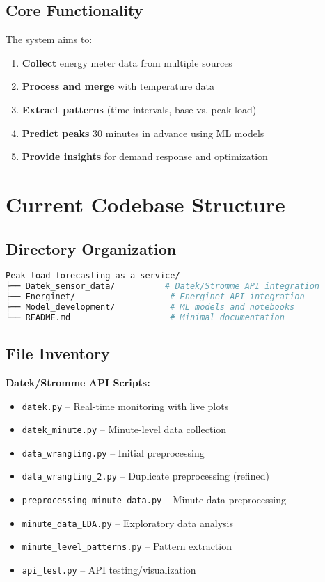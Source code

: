 \documentclass[11pt,a4paper]{article}
\begin{document}
\subsection{Core Functionality}

The system aims to:
\begin{enumerate}
    \item \textbf{Collect} energy meter data from multiple sources
    \item \textbf{Process and merge} with temperature data
    \item \textbf{Extract patterns} (time intervals, base vs. peak load)
    \item \textbf{Predict peaks} 30 minutes in advance using ML models
    \item \textbf{Provide insights} for demand response and optimization
\end{enumerate}

\section{Current Codebase Structure}

\subsection{Directory Organization}

\begin{lstlisting}[language=bash, caption={Current directory structure}]
Peak-load-forecasting-as-a-service/
├── Datek_sensor_data/          # Datek/Stromme API integration
├── Energinet/                   # Energinet API integration  
├── Model_development/           # ML models and notebooks
└── README.md                    # Minimal documentation
\end{lstlisting}

\subsection{File Inventory}

\textbf{Datek/Stromme API Scripts:}
\begin{itemize}
    \item \texttt{datek.py} -- Real-time monitoring with live plots
    \item \texttt{datek\_minute.py} -- Minute-level data collection
    \item \texttt{data\_wrangling.py} -- Initial preprocessing
    \item \texttt{data\_wrangling\_2.py} -- Duplicate preprocessing (refined)
    \item \texttt{preprocessing\_minute\_data.py} -- Minute data preprocessing
    \item \texttt{minute\_data\_EDA.py} -- Exploratory data analysis
    \item \texttt{minute\_level\_patterns.py} -- Pattern extraction
    \item \texttt{api\_test.py} -- API testing/visualization
\end{itemize}
\end{document}
